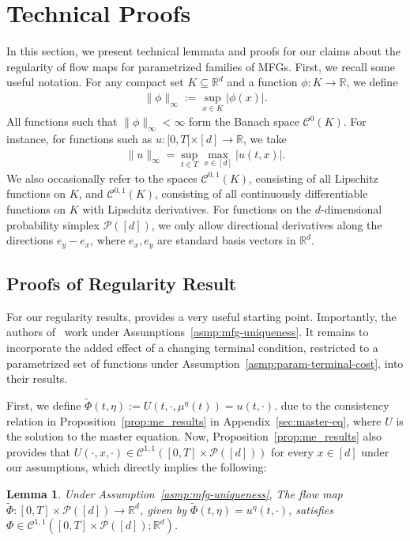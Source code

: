 \documentclass[11pt,reqno]{amsart}
\numberwithin{equation}{section}
\theoremstyle{plain}
\newtheorem{lemma}{Lemma}[section]
\newcommand{\R}{\mathbb{R}}
\newcommand{\calC}{{\mathcal C}}
\newcommand{\calP}{{\mathcal P}}
\newcommand{\1}{\boldsymbol{\mathbbm{1}}}
\begin{document}
\section{Technical Proofs}
\label{sec:technical-proofs}
In this section, we present technical lemmata and proofs for our claims about the regularity of flow maps for parametrized families of MFGs. First, we recall some useful notation. For any compact set $K \subseteq \R^d$ and a function $\phi : K \to \R$, we define
\begin{align*}
    \|\phi\|_{\infty} := \sup_{x \in K} |\phi(x)|.
\end{align*}
All functions such that $\|\phi\|_{\infty} < \infty$ form the Banach space $\calC^0(K)$. For instance, for functions such as $u : [0, T[ \times [d] \to \R$, we take
\begin{align*}
    \|u\|_{\infty} = \sup_{t \in T} \max_{x \in [d]} |u(t, x)|.
\end{align*}
We also occasionally refer to the spaces $\calC^{0, 1}(K)$, consisting of all Lipschitz functions on $K$, and $\calC^{0, 1}(K)$, consisting of all continuously differentiable functions on $K$ with Lipschitz derivatives. For functions on the $d$-dimensional probability simplex $\calP([d])$, we only allow directional derivatives along the directions $e_y  - e_x$, where $e_x, e_y$ are standard basis vectors in $\R^d$.

\subsection{Proofs of Regularity Result}
\label{sec:proofs-reg}
For our regularity results, \cite[Proposition 5]{cec-pel2019} provides a very useful starting point. Importantly, the authors of~\cite{cec-pel2019} work under Assumptions~\ref{asmp:mfg-uniqueness}. It remains to incorporate the added effect of a changing terminal condition, restricted to a parametrized set of functions under Assumption~\ref{asmp:param-terminal-cost}, into their results.

First, we define $\tilde{\Phi}(t, \eta) := U(t, \cdot, \mu^{\eta}(t)) = u(t, \cdot)$. due to the consistency relation in Proposition~\ref{prop:me_results} in Appendix~\ref{sec:master-eq}, where $U$ is the solution to the master equation. Now, Proposition~\ref{prop:me_results} also provides that $U(\cdot, x, \cdot) \in \calC^{1,1}([0, T] \times \calP([d]))$ for every $x \in [d]$ under our assumptions, which directly implies the following:
\begin{lemma}
\label{lem:simplified-flow-regularity}
Under Assumption~\ref{asmp:mfg-uniqueness}, The flow map $\tilde{\Phi} : [0, T] \times \calP([d]) \to \R^d$, given by $\tilde{\Phi}(t, \eta) = u^{\eta}(t, \cdot)$, satisfies $\Phi \in \calC^{1,1}([0, T] \times \calP([d]) ; \R^d)$.
\end{lemma}
\end{document}
